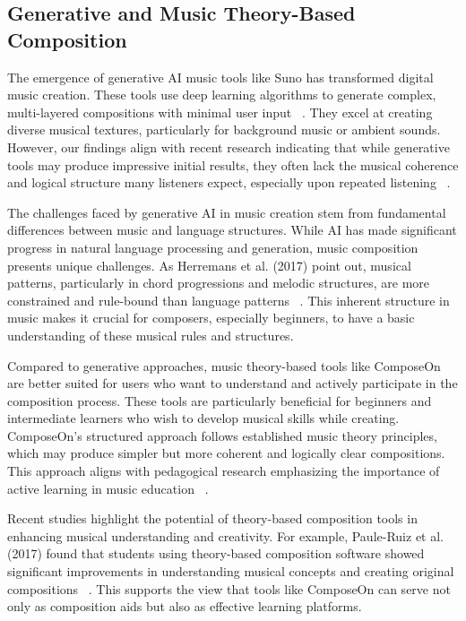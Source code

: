 \subsection{Generative and Music Theory-Based Composition}

The emergence of generative AI music tools like Suno has transformed digital music creation. These tools use deep learning algorithms to generate complex, multi-layered compositions with minimal user input ~\cite{briot2020deep}. They excel at creating diverse musical textures, particularly for background music or ambient sounds. However, our findings align with recent research indicating that while generative tools may produce impressive initial results, they often lack the musical coherence and logical structure many listeners expect, especially upon repeated listening ~\cite{carnovalini2020computational,r22}.

The challenges faced by generative AI in music creation stem from fundamental differences between music and language structures. While AI has made significant progress in natural language processing and generation, music composition presents unique challenges. As Herremans et al. (2017) point out, musical patterns, particularly in chord progressions and melodic structures, are more constrained and rule-bound than language patterns ~\cite{herremans2017functional,r13}. This inherent structure in music makes it crucial for composers, especially beginners, to have a basic understanding of these musical rules and structures.

Compared to generative approaches, music theory-based tools like ComposeOn are better suited for users who want to understand and actively participate in the composition process. These tools are particularly beneficial for beginners and intermediate learners who wish to develop musical skills while creating. ComposeOn's structured approach follows established music theory principles, which may produce simpler but more coherent and logically clear compositions. This approach aligns with pedagogical research emphasizing the importance of active learning in music education ~\cite{wright2010informal,paule2017music}.

Recent studies highlight the potential of theory-based composition tools in enhancing musical understanding and creativity. For example, Paule-Ruiz et al. (2017) found that students using theory-based composition software showed significant improvements in understanding musical concepts and creating original compositions ~\cite{paule2017music}. This supports the view that tools like ComposeOn can serve not only as composition aids but also as effective learning platforms.


